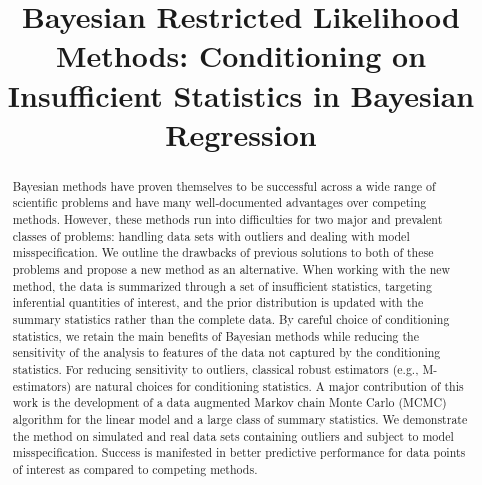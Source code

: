 \documentclass[ba]{imsart}
\begin{document}
\begin{frontmatter}
\title{Bayesian Restricted Likelihood Methods: Conditioning on Insufficient Statistics in Bayesian Regression}



\begin{abstract}
Bayesian methods have proven themselves to be successful across a wide
range of scientific problems and have many well-documented advantages
over competing methods. However, these methods run into difficulties
for two major and prevalent classes of problems: handling data sets
with outliers and dealing with model misspecification. We outline the
drawbacks of previous solutions to both of these problems and propose a new method as an
alternative.  When working with the new method, the data is summarized
through a set of insufficient statistics, targeting inferential quantities of interest, and the prior
distribution is updated with the summary statistics rather than the complete
data.  By careful choice of conditioning statistics, we
retain the main benefits of Bayesian methods while reducing the
sensitivity of the analysis to features of the data not captured by
the conditioning statistics. For reducing sensitivity to outliers,
classical robust estimators (e.g., M-estimators) are natural choices
for conditioning statistics. %
A major contribution of this work is the development of a data 
augmented Markov chain Monte Carlo (MCMC) algorithm
for the linear model and a large class of
summary statistics. We demonstrate the method on simulated and real data sets containing outliers and subject to model
misspecification. Success is manifested in better predictive
performance for data points of interest as compared to competing
methods.
\end{abstract}


\end{frontmatter}
\end{document}
